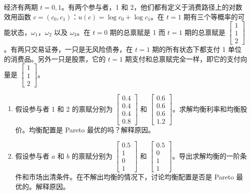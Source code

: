 
\begin{problem}
 经济有两期 $t=0,1$。有两个参与者，1 和 2，他们都有定义于消费路径上的对数效用函数 $c=(c_{0},c_{1})$：$u(c)=\log c_{0}+\log c_{1}$。在 $t=1$ 期有三个等概率的可能状态，$\omega_{1}$，$\omega_{2}$ 以及 $\omega_{3}$。在 $t=0$ 期的总禀赋是 1 而 $t=1$ 期的总禀赋是 $\begin{bmatrix}1 \\ 1 \\ 2\end{bmatrix}$。有两只交易证券，一只是无风险债券，在 $t=1$ 期的所有状态下都支付 1 单位的消费品。另外一只是股票，它的 $t=1$ 期支付和总禀赋完全一样，即它的支付向量是 $\begin{bmatrix}1 \\ 1 \\ 2\end{bmatrix}$。
\begin{enumerate}[label=(\alph*)]
    \item 假设参与者 1 和 2 的禀赋分别为 $\begin{bmatrix}0.4\\0.4\\0.4\\0.8\end{bmatrix}$ 和 $\begin{bmatrix}0.6\\0.6\\0.6\\1.2\end{bmatrix}$。求解均衡利率和均衡股价。均衡配置是 Pareto 最优的吗？解释原因。
    \item 假设参与者 $a$ 和 $b$ 的禀赋分别为 $\begin{bmatrix}0.5\\1\\0\\1\end{bmatrix}$ 和 $\begin{bmatrix}0.5\\0\\1\\1\end{bmatrix}$。导出求解均衡的一阶条件和市场出清条件。在不解出均衡的情况下，讨论均衡配置是否是 Pareto 最优的。解释原因。
\end{enumerate}
\end{problem}
